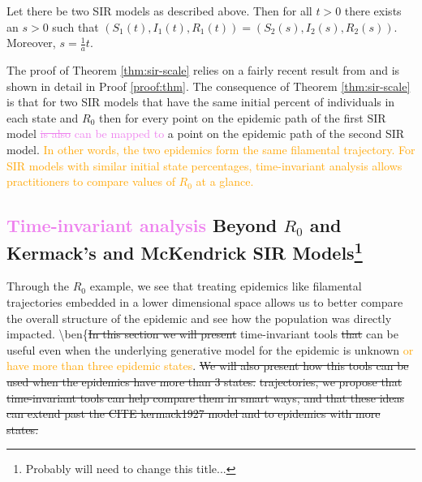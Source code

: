 \documentclass[
  shortnames]{jss}
\begin{document}
\begin{theorem}\label{thm:sir-scale}
Let there be two SIR models as described above.  Then for all $t > 0$ there exists an $s>0$ such that $(S_1(t), I_1(t), R_1(t)) = (S_2(s), I_2(s), R_2(s))$.  Moreover, $s = \frac{1}{a}t$.
\end{theorem}

The proof of Theorem \ref{thm:sir-scale} relies on a fairly recent
result from \cite{Harko2014} and is shown in detail in Proof
\ref{proof:thm}. The consequence of Theorem \ref{thm:sir-scale} is that
for two SIR models that have the same initial percent of individuals in
each state and \(R_0\) then for every point on the epidemic path of the
first SIR model \textcolor{violet}{\sout{is also} can be mapped to} a
point on the epidemic path of the second SIR model.
\textcolor{orange}{In other words, the two epidemics form the same filamental trajectory. For SIR models with similar initial state percentages, time-invariant analysis allows practitioners to compare values of $R_0$ at a glance.}

\subsection[Beyond R0 and SIR]{\textcolor{violet}{Time-invariant analysis}
Beyond \(R_0\) and Kermack's and McKendrick SIR
Models\footnote{Probably will need to change this title...}}\label{beyond-r0-sir}

Through the \(R_0\) example, we see that treating epidemics like
filamental trajectories embedded in a lower dimensional space allows us
to better compare the overall structure of the epidemic and see how the
population was directly impacted.
\textbackslash ben\{\sout{In this section we will present}
time-invariant tools \sout{that} can be useful even when the underlying
generative model for the epidemic is unknown
\textcolor{orange}{or have more than three epidemic states}.
\sout{We will also present how this tools can be used when the epidemics have more than 3 states.}
\sout{trajectories, we propose that time-invariant tools can help compare them in smart ways, and that these ideas can extend past the CITE kermack1927 model and to epidemics with more states. }
\end{document}
